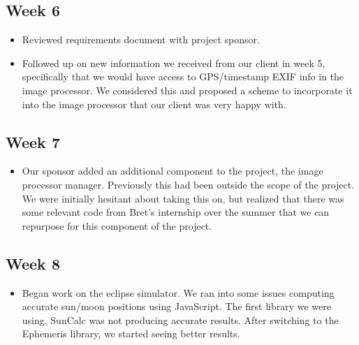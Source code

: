 \documentclass[10pt, onecolumn, draftclsnofoot, letterpaper, compsoc]{IEEEtran}
\begin{document}
\subsection{Week 6}

    \begin{itemize}

    \item Reviewed requirements document with project sponsor.

    \item Followed up on new information we received from our client in week 5, 
    specifically that we would have access to GPS/timestamp EXIF info in the 
    image processor. We considered this and proposed a scheme to incorporate it 
    into the image processor that our client was very happy with.

    \end{itemize}

\subsection{Week 7}

    \begin{itemize}

    \item Our sponsor added an additional component to the project, the image 
    processor manager. Previously this had been outside the scope of the project. 
    We were initially hesitant about taking this on, but realized that there was 
    some relevant code from Bret’s internship over the summer that we can 
    repurpose for this component of the project.

    \end{itemize}

\subsection{Week 8}

    \begin{itemize}

    \item Began work on the eclipse simulator. We ran into some issues computing 
    accurate sun/moon positions using JavaScript. The first library we were 
    using, SunCalc was not producing accurate results. After switching to the 
    Ephemeris library, we started seeing better results.

    \end{itemize}
\end{document}
